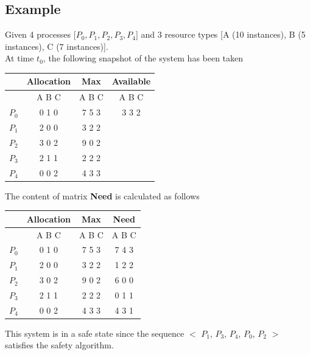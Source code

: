 \documentclass[oneside]{book}
\begin{document}
            \subsection{Example}
                Given 4 processes [$P_0, P_1, P_2, P_3, P_4$] and 3 resource types [A (10 instances), B (5 instances), C (7 instances)].\\
                At time $t_0$, the following snapshot of the system has been taken\\
                \begin{center}
                    \begin{tabular}{cccc}
                        & Allocation & Max & Available\\
                        \toprule
                        & A B C & A B C & A B C\\
                        $P_0$ & 0 1 0 & 7 5 3 & 3 3 2\\
                        $P_1$ & 2 0 0 & 3 2 2 & \\
                        $P_2$ & 3 0 2 & 9 0 2 & \\
                        $P_3$ & 2 1 1 & 2 2 2 & \\
                        $P_4$ & 0 0 2 & 4 3 3 & \\
                        \bottomrule
                    \end{tabular}
                \end{center}
                The content of matrix \textbf{Need} is calculated as follows
                \begin{center}
                    \begin{tabular}{cccc}
                        & Allocation & Max & Need\\
                        \toprule
                        & A B C & A B C & A B C\\
                        $P_0$ & 0 1 0 & 7 5 3 & 7 4 3\\
                        $P_1$ & 2 0 0 & 3 2 2 & 1 2 2\\
                        $P_2$ & 3 0 2 & 9 0 2 & 6 0 0\\
                        $P_3$ & 2 1 1 & 2 2 2 & 0 1 1\\
                        $P_4$ & 0 0 2 & 4 3 3 & 4 3 1\\
                        \bottomrule
                    \end{tabular}
                \end{center}
                This system is in a safe state since the sequence $<$ $P_1$, $P_3$, $P_4$, $P_0$, $P_2$ $>$ satisfies the safety algorithm.\\
\end{document}
